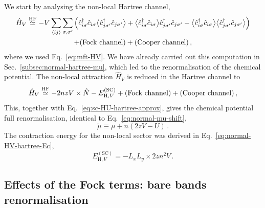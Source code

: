 We start by analysing the non-local Hartree channel,
\begin{multline*}
	\hat H_V \HFsimeq -V \sum_{\ev{ij}} \sum_{\sigma,\sigma'} \Big(
	\hat c_{i\sigma}^\dagger \hat c_{i\sigma} \big\langle \hat c_{j\sigma'}^\dagger \hat c_{j\sigma'} \big\rangle + \big\langle \hat c_{i\sigma}^\dagger \hat c_{i\sigma} \big\rangle \hat c_{j\sigma'}^\dagger \hat c_{j\sigma'} - \big\langle \hat c_{i\sigma}^\dagger \hat c_{i\sigma} \big\rangle  \big\langle \hat c_{j\sigma'}^\dagger \hat c_{j\sigma'} \big\rangle \Big) \\
	+ (\text{Fock channel}) + (\text{Cooper channel}) \, ,
\end{multline*}
where we used Eq.~\eqref{eq:mft-HV}. We have already carried out this computation in Sec.~\ref{subsec:normal-hartree-mu}, which led to the renormalisation of the chemical potential. The non-local attraction $\hat H_V$ is reduced in the Hartree channel to
\begin{equation}\label{eq:sc-HV-hartree-approx}
	\hat H_V \stackrel{\mathrm{HF}}{\simeq} -2nzV \times \hat N - E_{\mathrm{H},V}^{(\mathrm{SC})} + (\text{Fock channel}) + (\text{Cooper channel}) \, ,
\end{equation}
This, together with Eq.~\eqref{eq:sc-HU-hartree-approx}, gives the chemical potential full renormalisation, identical to Eq.~\eqref{eq:normal-mu-shift},
\begin{equation}\label{appeq:sc-mu-shift}
	\tilde{\mu} \equiv \mu + n(2zV-U) \, .
\end{equation}
The contraction energy for the non-local sector was derived in Eq.~\eqref{eq:normal-HV-hartree-Ec},
\begin{equation}\label{eq:sc-HV-hartree-Ec}
	E_{\mathrm{H},V}^{(\mathrm{SC})} = - L_x L_y \times 2zn^2 V \, .
\end{equation}

\subsection{Effects of the Fock terms: bare bands renormalisation}\label{subsec:sc-fock}

